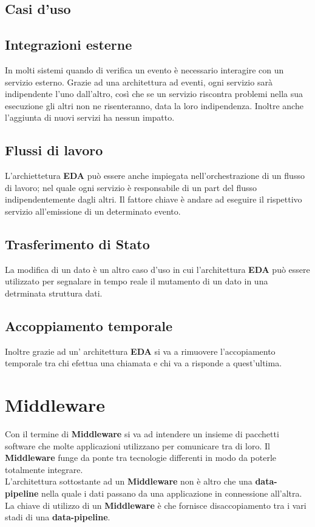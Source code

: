 \documentclass{article}
\begin{document}
\subsection{Casi d'uso}
\subsection{Integrazioni esterne}
In molti sistemi quando di verifica un evento è necessario interagire con un servizio esterno. Grazie ad una architettura ad eventi, ogni servizio sarà indipendente l'uno dall'altro, così che se un servizio riscontra problemi nella sua esecuzione gli altri non ne risenteranno, data la loro indipendenza. Inoltre anche l'aggiunta di nuovi servizi ha nessun impatto. 
\subsection{Flussi di lavoro}
L'archiettetura \textbf{EDA} può essere anche impiegata nell'orchestrazione di un flusso di lavoro; nel quale ogni servizio è responsabile di un part del flusso indipendentemente dagli altri. Il fattore chiave è andare ad eseguire il rispettivo servizio all'emissione di un determinato evento.
\subsection{Trasferimento di Stato}
La modifica di un dato è un altro caso d'uso in cui l'architettura \textbf{EDA} può essere utilizzato per segnalare in tempo reale il mutamento di un dato in una detrminata struttura dati.
\subsection{Accoppiamento temporale}
Inoltre grazie ad un' architettura \textbf{EDA} si va a rimuovere l'accopiamento temporale tra chi efettua una chiamata e chi va a risponde a quest'ultima.
\section{Middleware}
Con il termine di \textbf{Middleware} si va ad intendere un insieme di pacchetti software che molte applicazioni utilizzano per comunicare tra di loro. Il \textbf{Middleware} funge da ponte tra tecnologie differenti in modo da poterle totalmente integrare.\\
L'architettura sottostante ad un \textbf{Middleware} non è altro che una \textbf{data-pipeline} nella quale i dati passano da una applicazione in connessione all'altra. \\
La chiave di utilizzo di un \textbf{Middleware} è che fornisce disaccopiamento tra i vari stadi di una \textbf{data-pipeline}.
\end{document}
